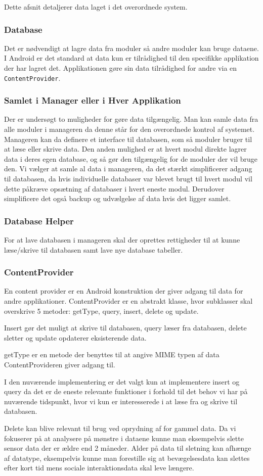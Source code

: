 Dette afsnit detaljerer data laget i det overordnede system. 

\subsubsection{Database}
Det er nødvendigt at lagre data fra moduler så andre moduler kan bruge dataene.
I Android er det standard at data kun er tilrådighed til den specifikke applikation der har lagret det.
Applikationen gøre sin data tilrådighed for andre via en \texttt{ContentProvider}.

\subsubsection{Samlet i Manager eller i Hver Applikation}
Der er undersøgt to muligheder for gøre data tilgængelig.
Man kan samle data fra alle moduler i manageren da denne står for den overordnede kontrol af systemet. 
Manageren kan da definere et interface til databasen, som så moduler bruger til at læse eller skrive data. 
Den anden mulighed er at hvert modul direkte lagrer data i deres egen database, og så gør den tilgængelig for de moduler der vil bruge den.
Vi vælger at samle al data i manageren, da det stærkt simplificerer adgang til databasen, da hvis individuelle databaser var blevet brugt til hvert modul vil dette påkræve opsætning af databaser i hvert eneste modul.
Derudover simplificere det også backup og udvælgelse af data hvis det ligger samlet.

\subsubsection{Database Helper}
For at lave databasen i manageren skal der oprettes rettigheder til at kunne læse/skrive til databasen samt lave nye database tabeller.

\subsubsection{ContentProvider}
En content provider er en Android konstruktion der giver adgang til data for andre applikationer.
ContentProvider er en abstrakt klasse, hvor subklasser skal overskrive 5 metoder:  getType, query, insert, delete og update. \cite{contentprovider}

Insert gør det muligt at skrive til databasen, query læser fra databasen, delete sletter og update opdaterer eksisterende data.

getType er en metode der benyttes til at angive MIME typen af data ContentProvideren giver adgang til.

I den nuværende implementering er det valgt kun at implementere insert og query da det er de eneste relevante funktioner i forhold til det behov vi har på nuværende tidspunkt, hvor vi kun er interesserede i at læse fra og skrive til databasen.

Delete kan blive relevant til brug ved oprydning af for gammel data. Da vi fokuserer på at analysere på mønstre i dataene kunne man eksempelvis slette sensor data der er ældre end 2 måneder. 
Alder på data til sletning kan afhænge af datatype, eksempelvis kunne man forestille sig at bevægelsesdata kan slettes efter kort tid mens sociale interaktionsdata skal leve længere.